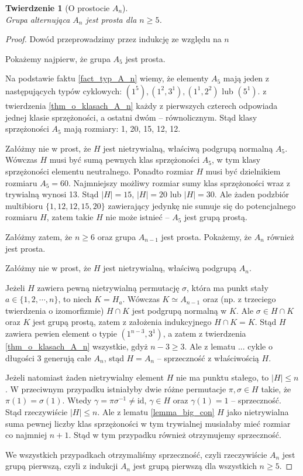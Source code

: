 \documentclass[licencjacka]{pracamgr}
\newtheorem{thh}{Twierdzenie}[section]
\begin{document}
\begin{thh}[O prostocie $A_n$] $ $ \\
	Grupa alternująca $A_n$ jest prosta dla $n \ge 5$.
\end{thh}
\begin{proof}
	Dowód przeprowadzimy przez indukcję ze względu na $n$

	Pokażemy najpierw, że grupa $A_5$ jest prosta.

	Na podstawie faktu \ref{fact_typ_A_n} wiemy, że elementy $A_5$ mają jeden z następujących typów cyklowych:
	$(1^5), (1^2, 3^1), (1^1, 2^2)$ lub $(5^1)$.
	z twierdzenia \ref{thm_o_klasach_A_n} każdy z pierwszych czterech odpowiada jednej klasie sprzężoności, a ostatni dwóm -- równolicznym.
	Stąd klasy sprzężoności $A_5$ mają rozmiary: 1, 20, 15, 12, 12.

	Załóżmy nie w prost, że $H$ jest nietrywialną, właściwą podgrupą normalną $A_5$.
	Wówczas $H$ musi być sumą pewnych klas sprzężoności $A_5$, w tym klasy sprzężoności elementu neutralnego.
	Ponadto rozmiar $H$ musi być dzielnikiem rozmiaru $A_5 = 60$.
	Najmniejszy możliwy rozmiar sumy klas sprzężoności wraz z trywialną wynosi 13.
	Stąd $|H| = 15$, $|H| = 20$ lub $|H| = 30$.
	Ale żaden podzbiór multibioru $\{1, 12, 12, 15, 20 \}$ zawierający jedynkę nie sumuje się do potencjalnego rozmiaru $H$,
	zatem takie $H$ nie może istnieć -- $A_5$ jest grupą prostą.

\pagebreak[2]

	Załóżmy zatem, że $n \ge 6$ oraz grupa $A_{n-1}$ jest prosta.
	Pokażemy, że $A_n$ również jest prosta.

	Załóżmy nie w prost, że $H$ jest nietrywialną, właściwą podgrupą $A_n$.

	Jeżeli $H$ zawiera pewną nietrywialną permutację $\sigma$, która ma punkt stały $a \in \{ 1, 2, \cdots, n \}$, to niech $K = H_a$.
	Wówczas $K \simeq A_{n-1}$ oraz (np. z trzeciego twierdzenia o izomorfizmie) $H \cap K$ jest podgrupą normalną w $K$.
	Ale $\sigma \in H \cap K$ oraz $K$ jest grupą prostą, zatem z założenia indukcyjnego $H \cap K = K$.
	Stąd $H$ zawiera pewien element o typie $(1^{n-3}, 3^1)$, a zatem z twierdzenia \ref{thm_o_klasach_A_n} wszystkie, gdyż $n-3 \ge 3$.
	Ale z lematu ... %
	cykle o długości 3 generują całe $A_n$, stąd $H = A_n$ -- sprzeczność z właściwością $H$.

	Jeżeli natomiast żaden nietrywialny element $H$ nie ma punktu stałego, to $|H| \le n$.
	W przeciwnym przypadku istniałyby dwie różne permutacje $\pi, \sigma \in H$ takie, że $\pi(1) = \sigma(1)$.
	Wtedy $\gamma = \pi \sigma ^{-1} \ne \mathrm{id}$, $\gamma \in H$ oraz $\gamma(1) = 1$ -- sprzeczność.
	Stąd rzeczywiście $|H| \le n$.
	Ale z lematu \ref{lemma_big_con} $H$ jako nietrywialna suma pewnej liczby klas sprzężoności w tym trywialnej musiałaby mieć rozmiar co najmniej $n+1$.
	Stąd w tym przypadku również otrzymujemy sprzeczność.

	We wszystkich przypadkach otrzymaliśmy sprzeczność, czyli rzeczywiście $A_n$ jest grupą pierwszą,
	czyli z indukcji $A_n$ jest grupą pierwszą dla wszystkich $n \ge 5$.
\end{proof}
\end{document}
